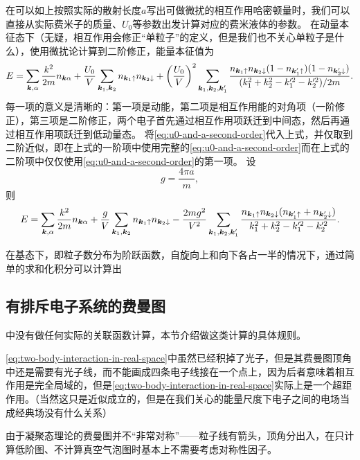 \documentclass[hyperref, UTF8, a4paper]{ctexart}
\begin{document}
在可以如上按照实际的散射长度$a$写出可做微扰的相互作用哈密顿量时，我们可以直接从实际费米子的质量、$U_0$等参数出发计算对应的费米液体的参数。
在动量本征态下（无疑，相互作用会修正“单粒子”的定义，但是我们也不关心单粒子是什么），使用微扰论计算到二阶修正，能量本征值为
\[
    E = \sum_{\vb*{k}, \alpha} \frac{k^2}{2m} n_{\vb*{k} \alpha} 
    + \frac{U_0}{V} \sum_{\vb*{k}_1, \vb*{k}_2} n_{\vb*{k}_1 \uparrow} n_{\vb*{k}_2 \downarrow}
    + \left( \frac{U_0}{V} \right)^2 \sum_{\vb*{k}_1, \vb*{k}_2, \vb*{k}_1'} \frac{n_{\vb*{k}_1 \uparrow} n_{\vb*{k}_2 \downarrow} (1 - n_{\vb*{k}_1' \uparrow}) (1 - n_{\vb*{k}_2' \downarrow})}{(k_1^2 + k_2^2 - k_1'^2 - k_2'^2) / 2m}.
\]
每一项的意义是清晰的：第一项是动能，第二项是相互作用能的对角项（一阶修正），第三项是二阶修正，两个电子首先通过相互作用项跃迁到中间态，然后再通过相互作用项跃迁到低动量态。
将\eqref{eq:u0-and-a-second-order}代入上式，并仅取到二阶近似，即在上式的一阶项中使用完整的\eqref{eq:u0-and-a-second-order}而在上式的二阶项中仅仅使用\eqref{eq:u0-and-a-second-order}的第一项。
设
\begin{equation}
    g = \frac{4\pi a}{m},
\end{equation}
则
\begin{equation}
    E = \sum_{\vb*{k}, \alpha} \frac{k^2}{2m} n_{\vb*{k} \alpha} + \frac{g}{V} \sum_{\vb*{k}_1, \vb*{k}_2} n_{\vb*{k}_1 \uparrow} n_{\vb*{k}_2 \downarrow} - \frac{2m g^2}{V^2} \sum_{\vb*{k}_1, \vb*{k}_2, \vb*{k}_1'} \frac{n_{\vb*{k}_1 \uparrow} n_{\vb*{k}_2 \downarrow} (n_{\vb*{k}_1' \uparrow} + n_{\vb*{k}_2' \downarrow})}{k_1^2 + k_2^2 - k_1'^2 - k_2'^2}.
\end{equation}

在基态下，即粒子数分布为阶跃函数，自旋向上和向下各占一半的情况下，通过简单的求和化积分可以计算出

\subsection{有排斥电子系统的费曼图}

中没有做任何实际的关联函数计算，本节介绍做这类计算的具体规则。

\eqref{eq:two-body-interaction-in-real-space}中虽然已经积掉了光子，但是其费曼图顶角中还是需要有光子线，而不能画成四条电子线接在一个点上，因为后者意味着相互作用是完全局域的，但是\eqref{eq:two-body-interaction-in-real-space}实际上是一个超距作用。（当然这只是近似成立的，但是在我们关心的能量尺度下电子之间的电场当成经典场没有什么关系）

由于凝聚态理论的费曼图并不“非常对称”——粒子线有箭头，顶角分出入，在只计算低阶图、不计算真空气泡图时基本上不需要考虑对称性因子。
\end{document}
